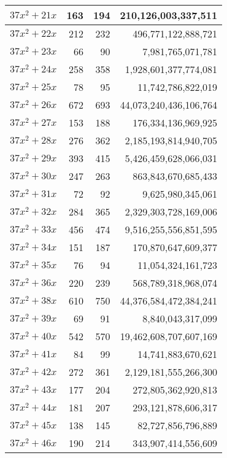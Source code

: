 \documentclass[a4paper]{amsproc}
\theoremstyle{plain}
\begin{document}
\begin{longtable}{ | l | r | r | r | }
$37x^2 + 21x$ & 163 & 194 & 210{,}126{,}003{,}337{,}511 \\ \hline
$37x^2 + 22x$ & 212 & 232 & 496{,}771{,}122{,}888{,}721 \\ \hline
$37x^2 + 23x$ & 66 & 90 & 7{,}981{,}765{,}071{,}781 \\ \hline
$37x^2 + 24x$ & 258 & 358 & 1{,}928{,}601{,}377{,}774{,}081 \\ \hline
$37x^2 + 25x$ & 78 & 95 & 11{,}742{,}786{,}822{,}019 \\ \hline
$37x^2 + 26x$ & 672 & 693 & 44{,}073{,}240{,}436{,}106{,}764 \\ \hline
$37x^2 + 27x$ & 153 & 188 & 176{,}334{,}136{,}969{,}925 \\ \hline
$37x^2 + 28x$ & 276 & 362 & 2{,}185{,}193{,}814{,}940{,}705 \\ \hline
$37x^2 + 29x$ & 393 & 415 & 5{,}426{,}459{,}628{,}066{,}031 \\ \hline
$37x^2 + 30x$ & 247 & 263 & 863{,}843{,}670{,}685{,}433 \\ \hline
$37x^2 + 31x$ & 72 & 92 & 9{,}625{,}980{,}345{,}061 \\ \hline
$37x^2 + 32x$ & 284 & 365 & 2{,}329{,}303{,}728{,}169{,}006 \\ \hline
$37x^2 + 33x$ & 456 & 474 & 9{,}516{,}255{,}556{,}851{,}595 \\ \hline
$37x^2 + 34x$ & 151 & 187 & 170{,}870{,}647{,}609{,}377 \\ \hline
$37x^2 + 35x$ & 76 & 94 & 11{,}054{,}324{,}161{,}723 \\ \hline
$37x^2 + 36x$ & 220 & 239 & 568{,}789{,}318{,}968{,}074 \\ \hline
$37x^2 + 38x$ & 610 & 750 & 44{,}376{,}584{,}472{,}384{,}241 \\ \hline
$37x^2 + 39x$ & 69 & 91 & 8{,}840{,}043{,}317{,}099 \\ \hline
$37x^2 + 40x$ & 542 & 570 & 19{,}462{,}608{,}707{,}607{,}169 \\ \hline
$37x^2 + 41x$ & 84 & 99 & 14{,}741{,}883{,}670{,}621 \\ \hline
$37x^2 + 42x$ & 272 & 361 & 2{,}129{,}181{,}555{,}266{,}300 \\ \hline
$37x^2 + 43x$ & 177 & 204 & 272{,}805{,}362{,}920{,}813 \\ \hline
$37x^2 + 44x$ & 181 & 207 & 293{,}121{,}878{,}606{,}317 \\ \hline
$37x^2 + 45x$ & 138 & 145 & 82{,}727{,}856{,}796{,}889 \\ \hline
$37x^2 + 46x$ & 190 & 214 & 343{,}907{,}414{,}556{,}609 \\ \hline

\end{longtable}
\end{document}
